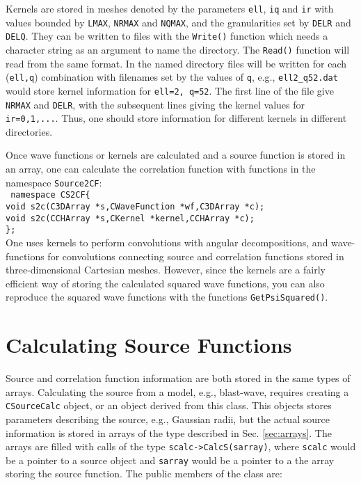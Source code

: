 \documentclass[10pt]{article}
\def\tab{\hspace*{9pt}}
\begin{document}
Kernels are stored in meshes denoted by the parameters {\tt ell}, {\tt iq} and {\tt ir} with values bounded by {\tt LMAX}, {\tt NRMAX} and {\tt NQMAX}, and the granularities set by {\tt DELR} and {\tt DELQ}. They can be written to files with the {\tt Write()} function which needs a character string as an argument to name the directory. The {\tt Read()} function will read from the same format. In the named directory files will be written for each ({\tt ell,q}) combination with filenames set by the values of {\tt q}, e.g., {\tt ell2\_q52.dat} would store kernel information for {\tt ell=2, q=52}. The first line of the file give {\tt NRMAX} and {\tt DELR}, with the subsequent lines giving the kernel values for {\tt ir=0,1,...}. Thus, one should store information for different kernels in different directories.

Once wave functions or kernels are calculated and a source function is stored in an array, one can calculate the correlation function with functions in the namespace {\tt Source2CF}:\\
{\tt
namespace CS2CF\{\\
\tab void s2c(C3DArray *s,CWaveFunction *wf,C3DArray *c);\\
\tab void s2c(CCHArray *s,CKernel *kernel,CCHArray *c);\\
\};}\\
One uses kernels to perform convolutions with angular decompositions, and wave-functions for convolutions connecting source and correlation functions stored in three-dimensional Cartesian meshes. However, since the kernels are a fairly efficient way of storing the calculated squared wave functions, you can also reproduce the squared wave functions with the functions {\tt GetPsiSquared()}.

\section{Calculating Source Functions}

Source and correlation function information are both stored in the same types of arrays. Calculating the source from a model, e.g., blast-wave, requires creating a {\tt CSourceCalc} object, or an object derived from this class. This objects stores parameters describing the source, e.g., Gaussian radii, but the actual source information is stored in arrays of the type described in Sec. \ref{sec:arrays}. The arrays are filled with calls of the type {\tt scalc->CalcS(sarray)}, where {\tt scalc} would be a pointer to a source object and {\tt sarray} would be a pointer to a the array storing the source function. The public members of the class are:
\end{document}
